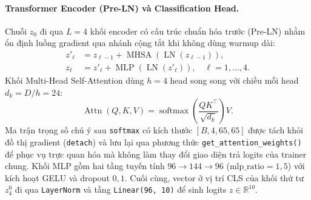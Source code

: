\paragraph{Transformer Encoder (Pre-LN) và Classification Head.}
Chuỗi $z_0$ đi qua $L=4$ khối encoder có cấu trúc chuẩn hóa trước (Pre-LN) nhằm ổn định luồng gradient qua nhánh cộng tắt khi không dùng warmup dài:
\[
\begin{aligned}
z'_\ell &= z_{\ell-1} + \operatorname{MHSA}\!\left(\operatorname{LN}(z_{\ell-1})\right),\\
z_\ell &= z'_\ell + \operatorname{MLP}\!\left(\operatorname{LN}(z'_\ell)\right), \quad \ell=1,\dots,4.
\end{aligned}
\]
Khối Multi-Head Self-Attention dùng $h=4$ head song song với chiều mỗi head $d_k = D/h = 24$:
\[
\operatorname{Attn}(Q,K,V) = \operatorname{softmax}\!\left(\frac{QK^\top}{\sqrt{d_k}}\right)V.
\]
Ma trận trọng số chú ý sau \texttt{softmax} có kích thước $[B, 4, 65, 65]$ được tách khỏi đồ thị gradient (\texttt{detach}) và lưu lại qua phương thức \texttt{get\_attention\_weights()} để phục vụ trực quan hóa mà không làm thay đổi giao diện trả logits của trainer chung. Khối MLP gồm hai tầng tuyến tính $96\rightarrow144\rightarrow96$ ($\text{mlp\_ratio}=1{,}5$) với kích hoạt GELU và dropout $0{,}1$. Cuối cùng, vector ở vị trí CLS của khối thứ tư $z_4^0$ đi qua \texttt{LayerNorm} và tầng \texttt{Linear(96, 10)} để sinh logits $z\in\mathbb{R}^{10}$.

\begin{table}[t]
\centering
{}
\caption{Phân rã số tham số có thể học giữa ResNet tự cài, ViT chuẩn và biến thể Ablation bỏ positional embedding (trong đó đầu vào ViT gồm $4.704+96+6.240=11.040$ và mỗi Encoder gồm $65.520$ tham số).}
\label{tab:params}
\end{table}
